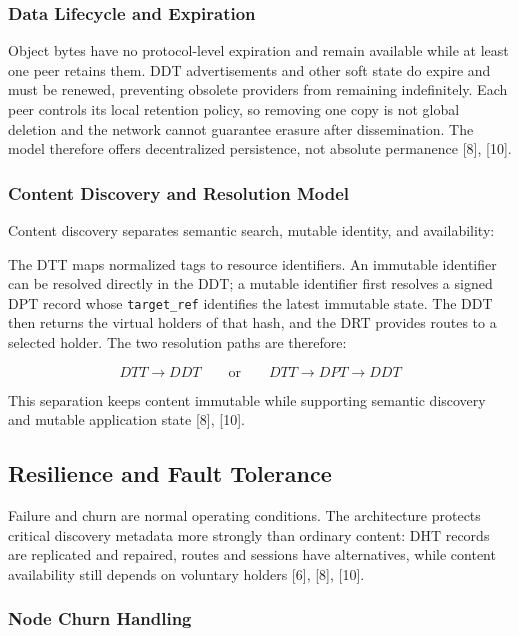\documentclass[12pt]{article}
\begin{document}
\subsubsection{Data Lifecycle and Expiration}

Object bytes have no protocol-level expiration and remain available while at least one
peer retains them. DDT advertisements and other soft state do expire and must be
renewed, preventing obsolete providers from remaining indefinitely. Each peer controls
its local retention policy, so removing one copy is not global deletion and the network
cannot guarantee erasure after dissemination. The model therefore offers decentralized
persistence, not absolute permanence [8], [10].

\subsubsection{Content Discovery and Resolution Model}

Content discovery separates semantic search, mutable identity, and availability:

\thesisdtttikz

The DTT maps normalized tags to resource identifiers. An immutable identifier can be
resolved directly in the DDT; a mutable identifier first resolves a signed DPT record
whose \texttt{target\_ref} identifies the latest immutable state. The DDT then returns
the virtual holders of that hash, and the DRT provides routes to a selected holder.
The two resolution paths are therefore:

\[
DTT \rightarrow DDT
\qquad\text{or}\qquad
DTT \rightarrow DPT \rightarrow DDT
\]

This separation keeps content immutable while supporting semantic discovery and
mutable application state [8], [10].



\subsection{Resilience and Fault Tolerance}

Failure and churn are normal operating conditions. The architecture protects critical
discovery metadata more strongly than ordinary content: DHT records are replicated
and repaired, routes and sessions have alternatives, while content availability still
depends on voluntary holders [6], [8], [10].

\subsubsection{Node Churn Handling}
\end{document}
